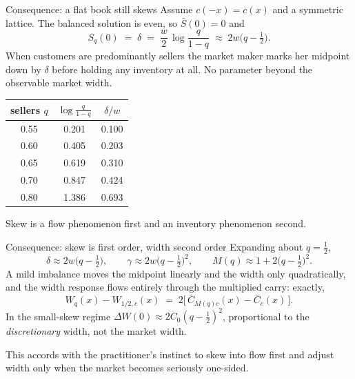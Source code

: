 \documentclass[10pt]{beamer}
\begin{document}
\begin{frame}{Consequence: a flat book still skews}
Assume $c(-x) = c(x)$ and a symmetric lattice. The balanced solution is even, so $\bar S(0) = 0$ and
\begin{equation}
S_q(0) \;=\; \delta \;=\; \frac{w}{2}\,\log\frac{q}{1-q} \;\approx\; 2w\Big(q - \tfrac12\Big).
\end{equation}
When customers are predominantly sellers the market maker marks her midpoint down by $\delta$ before holding any inventory at all. No parameter beyond the observable market width.
\begin{center}\small
\begin{tabular}{@{}ccc@{}}
\toprule
sellers $q$ & $\log\frac{q}{1-q}$ & $\delta / w$ \\
\midrule
0.55 & 0.201 & 0.100 \\
0.60 & 0.405 & 0.203 \\
0.65 & 0.619 & 0.310 \\
0.70 & 0.847 & 0.424 \\
0.80 & 1.386 & 0.693 \\
\bottomrule
\end{tabular}
\end{center}
Skew is a flow phenomenon first and an inventory phenomenon second.
\end{frame}

\begin{frame}{Consequence: skew is first order, width second order}
Expanding about $q = \tfrac12$,
{\small\[
\delta \approx 2w\Big(q-\tfrac12\Big), \qquad
\gamma \approx 2w\Big(q-\tfrac12\Big)^{2}, \qquad
M(q) \approx 1 + 2\Big(q-\tfrac12\Big)^{2} .
\]}
A mild imbalance moves the midpoint linearly and the width only quadratically, and the width response flows entirely through the multiplied carry: exactly,
\[
W_q(x) - W_{1/2,c}(x) \;=\; 2\big[\,\bar C_{M(q)c}(x) - \bar C_{c}(x)\,\big].
\]
In the small-skew regime $\Delta W(0) \approx 2C_0(q-\tfrac12)^2$, proportional to the \emph{discretionary} width, not the market width.
\vspace{1em}

This accords with the practitioner's instinct to skew into flow first and adjust width only when the market becomes seriously one-sided.
\end{frame}
\end{document}
